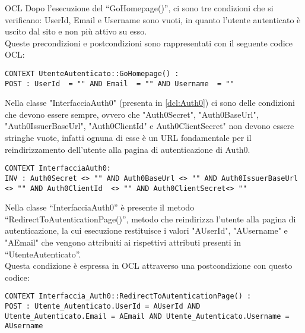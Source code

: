 \begin{listaPersonale}{OCL}
    Dopo l'esecuzione del “GoHomepage()”, ci sono tre condizioni che si verificano: UserId, Email e Username sono vuoti, in quanto l'utente autenticato è uscito dal sito e non più attivo su esso. \\
    Queste precondizioni e postcondizioni sono rappresentati con il seguente codice OCL:
    \begin{lstlisting}
CONTEXT UtenteAutenticato::GoHomepage() :
POST : UserId  = "" AND Email  = "" AND Username  = ""
    \end{lstlisting}




    \begin{center}
        
    \end{center}
    Nella classe "InterfacciaAuth0" (presenta in \ref{dcl:Auth0}) ci sono delle condizioni che devono essere sempre, ovvero che "Auth0Secret", "Auth0BaseUrl", "Auth0IssuerBaseUrl", "Auth0ClientId" e Auth0ClientSecret" non devono essere stringhe vuote, infatti ognuna di esse è un URL fondamentale per il reindirizzamento dell'utente alla pagina di autenticazione di Auth0.
    \begin{lstlisting}
CONTEXT InterfacciaAuth0:
INV : Auth0Secret <> "" AND Auth0BaseUrl <> "" AND Auth0IssuerBaseUrl <> "" AND Auth0ClientId  <> "" AND Auth0ClientSecret<> ""
    \end{lstlisting}

    Nella classe “InterfacciaAuth0”  è presente il metodo “RedirectToAutenticationPage()”, metodo che reindirizza l'utente alla pagina di autenticazione, la cui esecuzione restituisce i valori "AUserId", "AUsername" e "AEmail" che vengono attribuiti ai rispettivi attributi presenti in “UtenteAutenticato”. \\
    Questa condizione è espressa in OCL attraverso una postcondizione con questo codice:
    \begin{lstlisting}
CONTEXT Interfaccia_Auth0::RedirectToAutenticationPage() :
POST : Utente_Autenticato.UserId = AUserId AND Utente_Autenticato.Email = AEmail AND Utente_Autenticato.Username = AUsername
    \end{lstlisting}
    \newpage




\end{listaPersonale}
